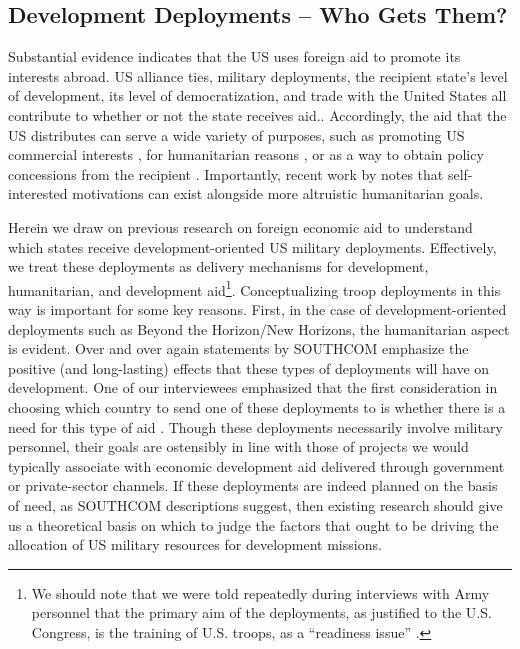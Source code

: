 \documentclass[12pt]{article}
\begin{document}
\begin{doublespace}
\subsection{Development Deployments -- Who Gets Them?}

Substantial evidence indicates that the US uses foreign aid to promote its interests abroad. US alliance ties, military deployments, the recipient state's level of development, its level of democratization, and trade with the United States all contribute to whether or not the state receives aid.\cite{MKP1998,AlesinaDollar2000,bdm07,FleckKilby2006,FleckKilby2010,MilnerTingley2011}. Accordingly, the aid that the US distributes can serve a wide variety of purposes, such as promoting US commercial interests \cite{FleckKilby2006,MilnerTingley2010}, for humanitarian reasons \cite{drury2005politics}, or as a way to obtain policy concessions from the recipient \cite{BDMetal2003}. Importantly, recent work by  notes that self-interested motivations can exist alongside more altruistic humanitarian goals.  

Herein we draw on previous research on foreign economic aid to understand which states receive development-oriented US military deployments. Effectively, we treat these deployments as delivery mechanisms for development, humanitarian, and development aid\footnote{We should note that we were told repeatedly during interviews with Army personnel that the primary aim of the deployments, as justified to the U.S. Congress, is the training of U.S. troops, as a ``readiness issue'' \cite{CPT20160309}.}. Conceptualizing troop deployments in this way is important for some key reasons. First, in the case of development-oriented deployments such as Beyond the Horizon/New Horizons, the humanitarian aspect is evident.  Over and over again statements by SOUTHCOM emphasize the positive (and long-lasting) effects that these types of deployments will have on development.  One of our interviewees emphasized that the first consideration in choosing which country to send one of these deployments to is whether there is a need for this type of aid \cite{CPT20160309}. Though these deployments necessarily involve military personnel, their goals are ostensibly in line with those of projects we would typically associate with economic development aid delivered through government or private-sector channels. If these deployments are indeed planned on the basis of need, as SOUTHCOM descriptions suggest, then existing research should give us a theoretical basis on which to judge the factors that ought to be driving the allocation of US military resources for development missions. 


\end{doublespace}
\end{document}
